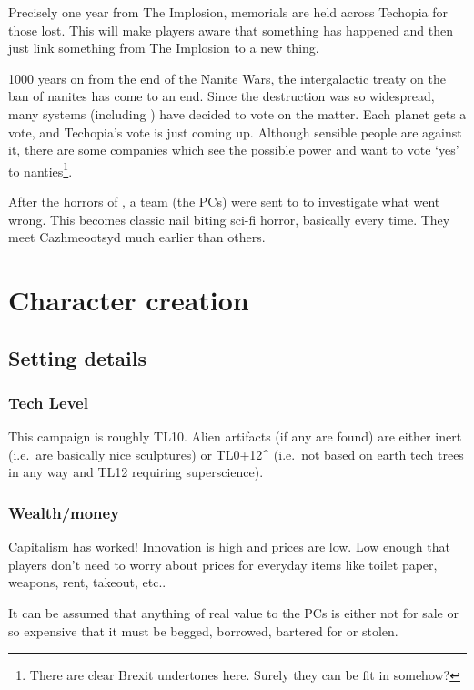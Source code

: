 Precisely one year from The Implosion, memorials are held across Techopia for
those lost. This will make players aware that something has happened and then
just link something from The Implosion to a new thing.

1000 years on from the end of the Nanite Wars, the intergalactic treaty on the
ban of nanites has come to an end. Since the destruction was so widespread, many
systems (including ) have decided to vote on the matter. Each planet
gets a vote, and Techopia's vote is just coming up. Although sensible people are
against it, there are some companies which see the possible power and want to
vote `yes' to nanties\footnote{There are clear Brexit undertones here. Surely
  they can be fit in somehow?}.

After the horrors of , a team (the PCs) were sent to  to
investigate what went wrong. This becomes classic nail biting sci-fi horror,
basically every time. They meet Cazhmeootsyd much earlier than others.



\chapter{Character creation}
\label{cha:character-creation}

\section{Setting details}
\label{sec:setting-details}

\subsection{Tech Level}
\label{sec:tech-level}

This campaign is roughly TL10. Alien artifacts (if any are found) are either
inert (i.e.~are basically nice sculptures) or TL0+12\^{} (i.e.~not based on
earth tech trees in any way and TL12 requiring superscience).

\subsection{Wealth/money}
Capitalism has worked! Innovation is high and prices are low. Low enough that 
players don't need to worry about prices for everyday items like toilet paper,
weapons, rent, takeout, etc..

It can be assumed that anything of real value to the PCs is either
not for sale or so expensive that it must be begged, borrowed, bartered for or
stolen.


